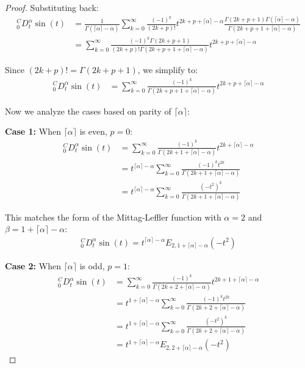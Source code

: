 \documentclass{article}
\begin{document}
\begin{proof}
Substituting back:
\begin{align}
_0^CD_t^\alpha \sin(t) &= \frac{1}{\Gamma(\lceil \alpha \rceil - \alpha)} \sum_{k=0}^{\infty} \frac{(-1)^k}{(2k+p)!} t^{2k+p+\lceil \alpha \rceil - \alpha} \frac{\Gamma(2k+p+1)\Gamma(\lceil \alpha \rceil - \alpha)}{\Gamma(2k+p+1+\lceil \alpha \rceil - \alpha)}\\
&= \sum_{k=0}^{\infty} \frac{(-1)^k \Gamma(2k+p+1)}{(2k+p)! \Gamma(2k+p+1+\lceil \alpha \rceil - \alpha)} t^{2k+p+\lceil \alpha \rceil - \alpha}
\end{align}

Since $(2k+p)! = \Gamma(2k+p+1)$, we simplify to:
\begin{align}
_0^CD_t^\alpha \sin(t) &= \sum_{k=0}^{\infty} \frac{(-1)^k}{\Gamma(2k+p+1+\lceil \alpha \rceil - \alpha)} t^{2k+p+\lceil \alpha \rceil - \alpha}
\end{align}

Now we analyze the cases based on parity of $\lceil \alpha \rceil$:

\textbf{Case 1:} When $\lceil \alpha \rceil$ is even, $p = 0$:
\begin{align}
_0^CD_t^\alpha \sin(t) &= \sum_{k=0}^{\infty} \frac{(-1)^k}{\Gamma(2k+1+\lceil \alpha \rceil - \alpha)} t^{2k+\lceil \alpha \rceil - \alpha}\\
&= t^{\lceil \alpha \rceil - \alpha} \sum_{k=0}^{\infty} \frac{(-1)^k t^{2k}}{\Gamma(2k+1+\lceil \alpha \rceil - \alpha)}\\
&= t^{\lceil \alpha \rceil - \alpha} \sum_{k=0}^{\infty} \frac{(-t^2)^k}{\Gamma(2k+1+\lceil \alpha \rceil - \alpha)}
\end{align}

This matches the form of the Mittag-Leffler function with $\alpha=2$ and $\beta=1+\lceil \alpha \rceil - \alpha$:
\begin{align}
_0^CD_t^\alpha \sin(t) = t^{\lceil \alpha \rceil - \alpha} E_{2,1+\lceil \alpha \rceil - \alpha}(-t^2)
\end{align}

\textbf{Case 2:} When $\lceil \alpha \rceil$ is odd, $p = 1$:
\begin{align}
_0^CD_t^\alpha \sin(t) &= \sum_{k=0}^{\infty} \frac{(-1)^k}{\Gamma(2k+2+\lceil \alpha \rceil - \alpha)} t^{2k+1+\lceil \alpha \rceil - \alpha}\\
&= t^{1+\lceil \alpha \rceil - \alpha} \sum_{k=0}^{\infty} \frac{(-1)^k t^{2k}}{\Gamma(2k+2+\lceil \alpha \rceil - \alpha)}\\
&= t^{1+\lceil \alpha \rceil - \alpha} \sum_{k=0}^{\infty} \frac{(-t^2)^k}{\Gamma(2k+2+\lceil \alpha \rceil - \alpha)}\\
&= t^{1+\lceil \alpha \rceil - \alpha} E_{2,2+\lceil \alpha \rceil - \alpha}(-t^2)
\end{align}


\end{proof}
\end{document}
